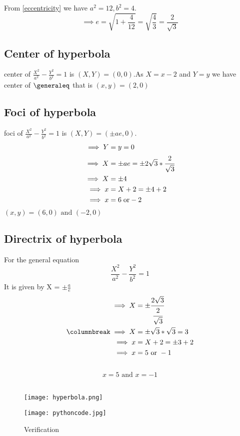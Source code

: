 \documentclass[journal,12pt,twocolumn]{article}
\newcommand{\generaleqa}{\frac{X^2}{a^2} - \frac{Y^2}{b^2} = 1}
\begin{document}
From \eqref{eccentricity} we have $a^2 = 12 , b^2 = 4$.
$$\implies e = \sqrt{1+\frac{4}{12}}=\sqrt{\frac{4}{3}}=\frac{2}{\sqrt{3}}$$
  \subsection*{Center of hyperbola}
  center of $\generaleqa$ is $(X,Y) = (0,0)$.As $X = x-2$ and $Y = y$
  we have center of $ \generaleq $ that is $(x,y) = (2,0)$ \\
  
  \subsection*{Foci of hyperbola}
  foci of $\generaleqa$ is $(X,Y) = (\pm ae,0)$.
  \begin{align*}
  \implies Y &= y = 0\\
  \implies X &= \pm ae = \pm 2\sqrt{3} * \cfrac{2}{\sqrt{3}}\\
  \implies X &= \pm 4 \\
  \implies x &= X+2 = \pm 4 + 2\\
  \implies x &= 6 \; \text{or} -2\\  
  \end{align*}
  \therefore {}$(x,y) = (6,0) \text{ and } (-2,0)$ \\
  \pagebreak

\subsection*{Directrix of hyperbola}
   For the general equation $$\generaleqa$$ It is
   given by X = $\pm \frac{a}{e}$\\
   \columnbreak
  \begin{align*}
      \implies X &= \pm \cfrac{2\sqrt{3}}{\cfrac{2}{\sqrt{3}}} \\
      \columnbreak
      \implies X &= \pm \sqrt{3}*\sqrt{3} = 3 \\
      \implies x &= X+2 = \pm3+2\\
      \implies x &= 5 \text{ or } -1\\
  \end{align*}
  \therefore {}\\
     $$x=5 \text{ and } x = -1$$\\
     


\begin{figure}[H]
    \centering
    \texttt{[image: hyperbola.png]}
    \label{fig:my_hyperbola}
\end{figure}

\begin{figure}[H]
    \centering
    \texttt{[image: pythoncode.jpg]}
    \caption*{Verification}
    \label{fig:my_code}
\end{figure}
\end{document}
